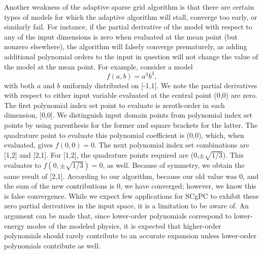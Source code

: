 Another weakness of the adaptive sparse grid algorithm is that 
there are certain types of models for which the adaptive algorithm will stall, converge too early, or
similarly fail.  For instance, if the partial derivative of the model with respect to any of the
input dimensions is zero when evaluated at the mean point (but nonzero elsewhere), the algorithm will falsely
converge prematurely, as adding additional polynomial orders to the input in question will not change the
value of the model at the mean point.  For example, consider a model
\begin{equation}
  f(a,b) = a^3b^3,
\end{equation}
with both $a$ and $b$ uniformly distributed on [-1,1].  We note the partial derivatives with respect to either
input variable evaluated at the central point (0,0) are zero.  The first polynomial index set point to
evaluate is zeroth-order in each dimension, [0,0].  We distinguish input domain points from polynomial index
set points by using parenthesis for the former and square brackets for the latter. The quadrature point to
evaluate this polynomial coefficient is (0,0), which, when evaluated, gives $f(0,0)=0$.  The next polynomial
index set combinations are [1,2] and [2,1].  For [1,2], the quadrature points required are
(0,$\pm\sqrt{1/3}$).  This evaluates to $f(0,\pm\sqrt{1/3})=0$, as well.  Because of symmetry, we obtain the
same result of [2,1].  According to our algorithm, because our old value was 0, and the sum of the new
contributions is 0, we have converged; however, we know this is false convergence.  While we expect few
applications for SCgPC to exhibit these zero partial derivatives in the input space, it is a limitation to be
aware of.  An argument can be made that, since lower-order polynomials correspond to lower-energy modes of the
modeled physics, it is expected that higher-order polynomials should rarely contribute to an accurate
expansion unless lower-order polynomials contribute as well.
